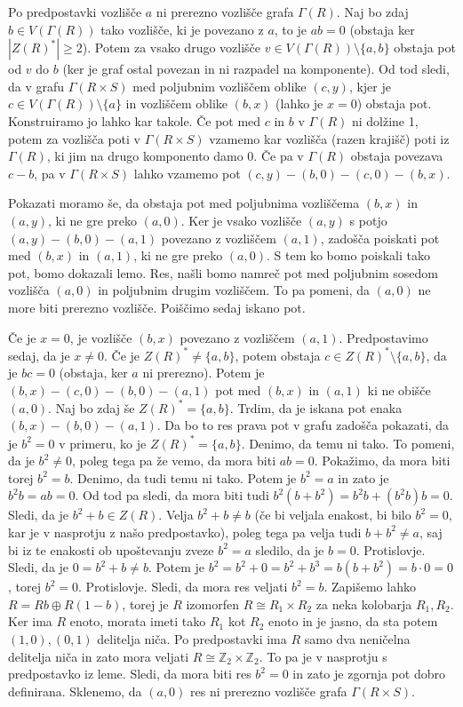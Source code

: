 \documentclass[a4paper, 12pt]{amsart}
\theoremstyle{definition} %
\theoremstyle{plain} %
\newcommand{\Z}{\mathbb Z}
\begin{document}
\proof
Po predpostavki vozlišče $a$ ni prerezno vozlišče grafa $\Gamma(R)$. Naj bo zdaj $b \in V(\Gamma(R))$ tako vozlišče, ki je povezano z $a$, to je $ab = 0$ (obstaja ker $|Z(R)^*|\ge 2$). Potem za vsako drugo vozlišče $v\in V(\Gamma(R)) \setminus \{a,b\}$ obstaja pot od $v$ do $b$ (ker je  graf ostal povezan in ni razpadel na komponente). Od tod sledi, da v grafu $\Gamma(R\times S)$ med poljubnim vozliščem oblike $(c,y)$, kjer je $c\in V( \Gamma(R))\setminus \{a\}$ in vozliščem oblike $(b,x)$ (lahko je $x=0$) obstaja pot. Konstruiramo jo lahko kar takole. Če pot med $c$ in $b$ v $\Gamma(R)$ ni dolžine 1, potem za vozlišča poti v $\Gamma(R\times S)$ vzamemo kar vozlišča (razen krajišč) poti iz $\Gamma(R)$, ki jim na drugo komponento damo 0. Če pa v $\Gamma(R)$ obstaja povezava $c-b$, pa v $\Gamma(R\times S)$ lahko vzamemo pot $(c,y)-(b,0)-(c,0)-(b,x)$.

Pokazati moramo še, da obstaja pot med poljubnima vozliščema $(b,x)$ in $(a,y)$, ki ne gre preko $(a,0)$. Ker je vsako vozlišče $(a,y)$ s potjo $(a,y)-(b,0)-(a,1)$ povezano z vozliščem $(a,1)$, zadošča poiskati pot med $(b,x)$ in $(a,1)$, ki ne gre preko $(a,0)$. S tem ko bomo poiskali tako pot, bomo dokazali lemo. Res, našli bomo namreč pot med poljubnim sosedom vozlišča $(a,0)$ in poljubnim drugim vozliščem. To pa pomeni, da $(a,0)$ ne more biti prerezno vozlišče. Poiščimo sedaj iskano pot.  

Če je $x=0$, je vozlišče $(b,x)$ povezano z vozliščem $(a,1)$. Predpostavimo sedaj, da je $x \neq 0$.
Če je $Z(R)^* \neq \{a,b\}$, potem obstaja $c\in Z(R)^* \setminus \{a,b\}$, da je $bc=0$ (obstaja, ker $a$ ni prerezno). Potem je $(b,x) - (c,0) - (b,0) - (a,1)$ pot med $(b,x)$ in $(a,1)$ ki ne obišče $(a,0)$. Naj bo zdaj še $Z(R)^* = \{a,b\}$. Trdim, da je iskana pot enaka $(b,x) - (b,0) - (a,1)$. Da bo to res prava pot v grafu zadošča pokazati, da je $b^2 = 0$ v primeru, ko je $Z(R)^* = \{a,b\}$. Denimo, da temu ni tako. To pomeni, da je $b^2 \neq 0$, poleg tega pa že vemo, da mora biti $ab=0$. Pokažimo, da mora biti torej $b^2  = b$. Denimo, da tudi temu ni tako. Potem je $b^2 = a$ in zato je $b^2 b = a b = 0$. Od tod pa sledi, da mora biti tudi $b^2 (b+b^2) = b^2 b + (b^2 b)b  = 0$. Sledi, da je $b^2 + b\in Z(R)$. Velja $b^2 + b\neq b$ (če bi veljala enakost, bi bilo $b^2 = 0$, kar je v nasprotju z našo predpostavko), poleg tega pa velja tudi $b+b^2 \neq a$, saj bi iz te enakosti ob upoštevanju zveze $b^2 = a$ sledilo, da je $b = 0$. Protislovje. Sledi, da je $0=b^2 + b\neq b $. Potem je $b^2 = b^2 + 0 = b^2 + b^3 = b(b+b^2) = b\cdot 0 = 0$, torej $b^2 = 0$. Protislovje. Sledi, da mora res veljati $b^2 = b$. Zapišemo lahko $R=Rb \oplus R(1-b)$, torej je $R$ izomorfen $R\cong R_1\times R_2$ za neka kolobarja $R_1,R_2$. Ker ima $R$ enoto, morata imeti tako $R_1$ kot $R_2$ enoto in je jasno, da sta potem $(1,0),(0,1)$ delitelja niča. Po predpostavki ima $R$ samo dva neničelna delitelja niča in zato mora veljati $R\cong \Z_2 \times \Z_2$. To pa je v nasprotju s predpostavko iz leme. Sledi, da mora biti res $b^2 = 0$ in zato je zgornja pot dobro definirana. Sklenemo, da $(a,0)$ res ni prerezno vozlišče grafa $\Gamma(R\times S)$.
\endproof
\end{document}
